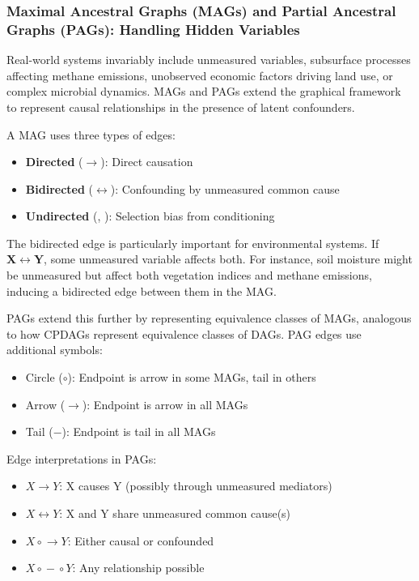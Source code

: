 \subsubsection{Maximal Ancestral Graphs (MAGs) and Partial Ancestral Graphs (PAGs): Handling Hidden Variables}

Real-world systems invariably include unmeasured variables, subsurface processes affecting methane emissions, unobserved economic factors driving land use, or complex microbial dynamics. MAGs and PAGs extend the graphical framework to represent causal relationships in the presence of latent confounders.

A MAG uses three types of edges:
\begin{itemize}
	\item \textbf{Directed} ($\rightarrow$): Direct causation
	\item \textbf{Bidirected} ($\leftrightarrow$): Confounding by unmeasured common cause
	\item \textbf{Undirected} (, ): Selection bias from conditioning
\end{itemize}

The bidirected edge is particularly important for environmental systems. If $\mathbf{X} \leftrightarrow \mathbf{Y}$, some unmeasured variable affects both. For instance, soil moisture might be unmeasured but affect both vegetation indices and methane emissions, inducing a bidirected edge between them in the MAG.

PAGs extend this further by representing equivalence classes of MAGs, analogous to how CPDAGs represent equivalence classes of DAGs. PAG edges use additional symbols:

\begin{itemize}
	\item Circle ($\circ$): Endpoint is arrow in some MAGs, tail in others
	\item Arrow ($\rightarrow$): Endpoint is arrow in all MAGs
	\item Tail ($-$): Endpoint is tail in all MAGs
\end{itemize}

Edge interpretations in PAGs:
\begin{itemize}
	\item $X \rightarrow Y$: X causes Y (possibly through unmeasured mediators)
	\item $X \leftrightarrow Y$: X and Y share unmeasured common cause(s)
	\item $X \circ\!\rightarrow Y$: Either causal or confounded
	\item $X \circ\!-\!\circ Y$: Any relationship possible
\end{itemize}

